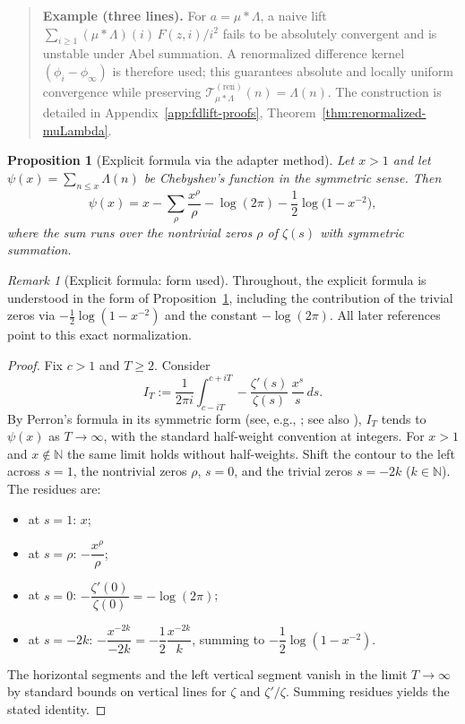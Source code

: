 \documentclass[11pt,a4paper]{amsart}
\theoremstyle{plain}
\newtheorem{proposition}[theorem]{Proposition}
\theoremstyle{definition}
\theoremstyle{remark}
\newtheorem{remark}[theorem]{Remark}
\begin{document}
\begin{quote}\small
\textbf{Example (three lines).}
For $a=\mu*\Lambda$, a naive lift $\sum_{i\ge1}(\mu*\Lambda)(i)\,F(z,i)/i^2$ fails to be absolutely convergent and is unstable under Abel summation.
A renormalized difference kernel $(\phi_i-\phi_\infty)$ is therefore used; this guarantees absolute and locally uniform convergence while preserving $\mathcal T^{(\mathrm{ren})}_{\mu*\Lambda}(n)=\Lambda(n)$.
The construction is detailed in Appendix~\ref{app:fdlift-proofs}, Theorem~\ref{thm:renormalized-muLambda}.
\end{quote}

\begin{proposition}[Explicit formula via the adapter method]\label{prop:adapter-explicit}
Let $x>1$ and let $\psi(x)=\sum_{n\le x}\Lambda(n)$ be Chebyshev's function in the symmetric sense. Then
\[
\psi(x)= x - \sum_{\rho}\frac{x^{\rho}}{\rho} - \log(2\pi) - \frac{1}{2}\log\!\bigl(1-x^{-2}\bigr),
\]
where the sum runs over the nontrivial zeros $\rho$ of $\zeta(s)$ with symmetric summation.
\end{proposition}

\begin{remark}[Explicit formula: form used]
Throughout, the explicit formula is understood in the form of Proposition~\ref{prop:adapter-explicit}, including the contribution of the trivial zeros via $-\tfrac12\log(1-x^{-2})$ and the constant $-\log(2\pi)$. All later references point to this exact normalization.
\end{remark}

\begin{proof}
Fix $c>1$ and $T\ge2$. Consider
\[
I_T:=\frac{1}{2\pi i}\int_{c-iT}^{c+iT} -\frac{\zeta'(s)}{\zeta(s)}\,\frac{x^{s}}{s}\,ds.
\]
By Perron's formula in its symmetric form (see, e.g., \cite[Thms.\ 4.11 and 4.16]{titchmarsh1986}; see also \cite[Ch.\ 3]{edwards2001}), $I_T$ tends to $\psi(x)$ as $T\to\infty$, with the standard half-weight convention at integers. For $x>1$ and $x\notin\mathbb N$ the same limit holds without half-weights. Shift the contour to the left across $s=1$, the nontrivial zeros $\rho$, $s=0$, and the trivial zeros $s=-2k$ ($k\in\mathbb{N}$). The residues are:
\begin{itemize}
\item at $s=1$: $x$;
\item at $s=\rho$: $-\dfrac{x^{\rho}}{\rho}$;
\item at $s=0$: $-\dfrac{\zeta'(0)}{\zeta(0)}=-\log(2\pi)$;
\item at $s=-2k$: $-\dfrac{x^{-2k}}{-2k}=-\dfrac{1}{2}\dfrac{x^{-2k}}{k}$, summing to $-\dfrac{1}{2}\log(1-x^{-2})$.
\end{itemize}
The horizontal segments and the left vertical segment vanish in the limit $T\to\infty$ by standard bounds on vertical lines for $\zeta$ and $\zeta'/\zeta$. Summing residues yields the stated identity.
\end{proof}
\end{document}
